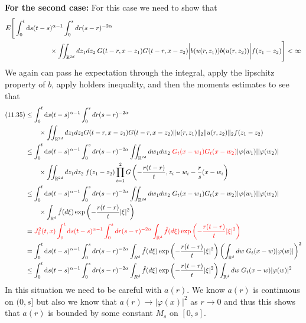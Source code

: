 \documentclass[a4paper,11pt]{article}
\theoremstyle{plain}
\theoremstyle{definition}
\newcommand{\ud}{\ensuremath{\mathrm{d}}}
\newcommand{\R}{\mathbb{R}}
\numberwithin{NQ}{section}
\numberwithin{LQ}{section}
\numberwithin{ZQ}{section}
\begin{document}
\noindent \textbf{For the second case:} For this case we need to show that 
\begin{align}
E\Bigg[\int_0^t \ud s (t-s&)^{\alpha-1}
    \int_0^s dr (s-r)^{-2\alpha} \notag
    \\ &\times \iint_{\R^{2d}}dz_1dz_2 \: G(t-r,x-z_1)G(t-r,x-z_2)\bigg|b(u(r,z_1))b(u(r,z_2))\bigg|f(z_1-z_2) \Bigg] < \infty
\end{align}
We again can pass he expectation through the integral, apply the lipschitz property of $b$, apply holders inequality, and then the moments estimates to see that 
\begin{align}
(11.35) &\le \int_0^t \ud s (t-s)^{\alpha-1}
    \int_0^s dr (s-r)^{-2\alpha}\notag \\&\quad \quad \times \iint_{\R^{2d}}dz_1dz_2 G(t-r,x-z_1)G(t-r,x-z_2)\Vert u(r,z_1)\Vert_2\Vert u(r,z_2)\Vert_2f(z_1-z_2) \notag
\\ &\le \int_0^t \ud s (t-s)^{\alpha-1}
    \int_0^s dr (s-r)^{-2\alpha}\iint_{\R^{2d}}dw_1dw_2\;\textcolor{red}{G_t(x-w_1)G_t(x-w_2)}|\varphi(w_1)||\varphi(w_2)| \notag
    \\ &\quad\quad \times \iint_{\R^{2d}}dz_1dz_2\;f(z_1-z_2)\prod_{i=1}^2G\left(-\dfrac{r(t-r)}{t},z_i-w_i-\frac{r}{s}(x-w_i\right) \notag
\\ &\le \int_0^t \ud s (t-s)^{\alpha-1}
    \int_0^s dr (s-r)^{-2\alpha}\iint_{\R^{2d}}dw_1dw_2\;G_t(x-w_1)G_t(x-w_2)|\varphi(w_1)||\varphi(w_2)| \notag
    \\ &\quad\quad \times \int_{\R^d}\hat f(d\xi)\exp\left( -\dfrac{r(t-r)}{t}|\xi|^2 \right) \notag
\\ & = \textcolor{red}{J_0^2(t,x) \int_0^t \ud s (t-s)^{\alpha-1}
    \int_0^s dr (s-r)^{-2\alpha} \int_{\R^d}\hat f(d\xi)\exp\left( -\dfrac{r(t-r)}{t}|\xi|^2 \right)} 
\\ &= \int_0^t \ud s (t-s)^{\alpha-1}
    \int_0^s dr (s-r)^{-2\alpha}\int_{R^d}\hat f(d\xi)\exp\left( -\dfrac{r(t-r)}{t}|\xi|^2 \right)\left(\int_{\R^d}dw\;G_t(x-w)|\varphi(w)|\right)^2 \notag
\\ &\le \int_0^t \ud s (t-s)^{\alpha-1}
    \int_0^s dr (s-r)^{-2\alpha}\int_{R^d}\hat f(d\xi)\exp\left( -\dfrac{r(t-r)}{t}|\xi|^2 \right)\int_{\R^d}dw\;G_t(x-w)|\varphi(w)|^2 
\end{align}
In this situation we need to be careful with $a(r)$. We know $a(r)$ is continuous on $(0,s]$ but also we know that $a(r) \to |\varphi(x)|^2 $ as $r \to 0$ and thus this shows that $a(r)$ is bounded by some constant $M_s$ on $[0,s]$. \\
\end{document}
